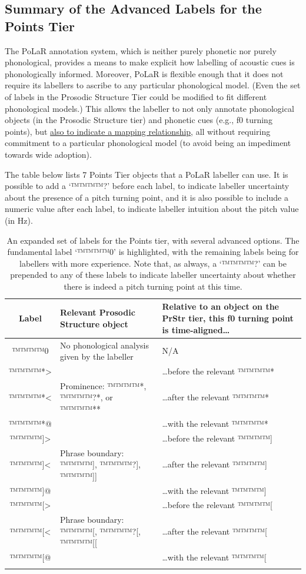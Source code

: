 \documentclass[11pt, twoside]{memoir}
\begin{document}
\subsection{Summary of the Advanced Labels for the Points Tier}\label{sec:summary-of-the-points-tier}

The PoLaR annotation system, which is neither purely phonetic nor purely phonological, provides a means to make explicit how labelling of acoustic cues is phonologically informed. Moreover, PoLaR is flexible enough that it does not require its labellers to ascribe to any particular phonological model. (Even the set of labels in the Prosodic Structure Tier could be modified to fit different phonological models.) This allows the labeller to not only annotate phonological objects (in the Prosodic Structure tier) and phonetic cues (e.g., f0 turning points), but \uline{also to indicate a mapping relationship}, all without requiring commitment to a particular phonological model (to avoid being an impediment towards wide adoption).

The table below lists 7 Points Tier objects that a PoLaR labeller can use. It is possible to add a ‘™™™™{?}’ before each label, to indicate labeller uncertainty about the presence of a pitch turning point, and it is also possible to include a numeric value after each label, to indicate labeller intuition about the pitch value (in Hz).

\begin{longtable}{c>{\centering}p{.33\linewidth}>{\centering\arraybackslash}p{.45\linewidth}} \toprule \textbf{Label} & \textbf{Relevant Prosodic Structure object} & \textbf{Relative to an object on the PrStr tier, this f0 turning point is time-aligned…}\tabularnewline
\midrule \endhead
\rowcolor{green}™™™™{0} & No phonological analysis given by the labeller & N/A\tabularnewline
\midrule
™™™™{*>} & & …before the relevant ™™™™{*}\tabularnewline
™™™™{*<} & Prominence: ™™™™{*}, ™™™™{?*}, or ™™™™{**} & …after the relevant ™™™™{*}\tabularnewline
™™™™{*@} & & …with the relevant ™™™™{*}\tabularnewline
\midrule
™™™™{]>} & & …before the relevant ™™™™{]}\tabularnewline
™™™™{]<} & Phrase boundary: ™™™™{]}, ™™™™{?]}, ™™™™{]]} & …after the relevant ™™™™{]}\tabularnewline
™™™™{]@} & & …with the relevant ™™™™{]}\tabularnewline
\midrule
™™™™{[>} & & …before the relevant ™™™™{[}\tabularnewline
™™™™{[<} & Phrase boundary: ™™™™{[}, ™™™™{?[}, ™™™™{[[} & …after the relevant ™™™™{[}\tabularnewline
™™™™{[@} & & …with the relevant ™™™™{[}\tabularnewline
\bottomrule
\caption[An expanded set of labels for the Points tier, with several advanced options.]{An expanded set of labels for the Points tier, with several advanced options. The fundamental label ‘™™™™{0}’ is highlighted, with the remaining labels being for labellers with more experience. Note that, as always, a ‘™™™™{?}’ can be prepended to any of these labels to indicate labeller uncertainty about whether there is indeed a pitch turning point at this time.}
\end{longtable}
\end{document}
